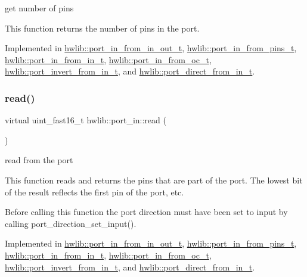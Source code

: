 get number of pins

This function returns the number of pins in the port. 

Implemented in \hyperlink{classhwlib_1_1port__in__from__in__out__t_a297458e2944e9952b09a36fe6ac30caf}{hwlib\+::port\+\_\+in\+\_\+from\+\_\+in\+\_\+out\+\_\+t}, \hyperlink{classhwlib_1_1port__in__from__pins__t_ab72fe2f09b460e2f15aee9bd2b16a068}{hwlib\+::port\+\_\+in\+\_\+from\+\_\+pins\+\_\+t}, \hyperlink{classhwlib_1_1port__in__from__in__t_a7a0d1cc244540a8183118c778d92deb2}{hwlib\+::port\+\_\+in\+\_\+from\+\_\+in\+\_\+t}, \hyperlink{classhwlib_1_1port__in__from__oc__t_a1b9fcc42a25a22ee96683c79a5b1b22c}{hwlib\+::port\+\_\+in\+\_\+from\+\_\+oc\+\_\+t}, \hyperlink{classhwlib_1_1port__invert__from__in__t_ac0b3edd19cf6da6b9d0db8b246e47778}{hwlib\+::port\+\_\+invert\+\_\+from\+\_\+in\+\_\+t}, and \hyperlink{classhwlib_1_1port__direct__from__in__t_a12ce68f2d796d1ddcf8b7ae1033d83a1}{hwlib\+::port\+\_\+direct\+\_\+from\+\_\+in\+\_\+t}.

\mbox{\label{classhwlib_1_1port__in_aa3aa277f9448c3ee493c56f05beb2ddb}} 
\subsubsection{\texorpdfstring{read()}{read()}}
{\footnotesize\ttfamily virtual uint\+\_\+fast16\+\_\+t hwlib\+::port\+\_\+in\+::read (\begin{DoxyParamCaption}{ }\end{DoxyParamCaption})\hspace{0.3cm}{\ttfamily [pure virtual]}}





read from the port

This function reads and returns the pins that are part of the port. The lowest bit of the result reflects the first pin of the port, etc.

Before calling this function the port direction must have been set to input by calling port\+\_\+direction\+\_\+set\+\_\+input(). 

Implemented in \hyperlink{classhwlib_1_1port__in__from__in__out__t_ab5307198f2acb61897da52a1043fa7a6}{hwlib\+::port\+\_\+in\+\_\+from\+\_\+in\+\_\+out\+\_\+t}, \hyperlink{classhwlib_1_1port__in__from__pins__t_a6a9d78c84eb3f7bbf0de76f39d5d7d04}{hwlib\+::port\+\_\+in\+\_\+from\+\_\+pins\+\_\+t}, \hyperlink{classhwlib_1_1port__in__from__in__t_a1c95b00a18f0df57064490c18e2dd96b}{hwlib\+::port\+\_\+in\+\_\+from\+\_\+in\+\_\+t}, \hyperlink{classhwlib_1_1port__in__from__oc__t_aaf875d99cf56fb579152a9977652f202}{hwlib\+::port\+\_\+in\+\_\+from\+\_\+oc\+\_\+t}, \hyperlink{classhwlib_1_1port__invert__from__in__t_a757144b4b465c6d81f222698ea217f47}{hwlib\+::port\+\_\+invert\+\_\+from\+\_\+in\+\_\+t}, and \hyperlink{classhwlib_1_1port__direct__from__in__t_a19f5b6527913815e206cfc2e93a52d1e}{hwlib\+::port\+\_\+direct\+\_\+from\+\_\+in\+\_\+t}.

